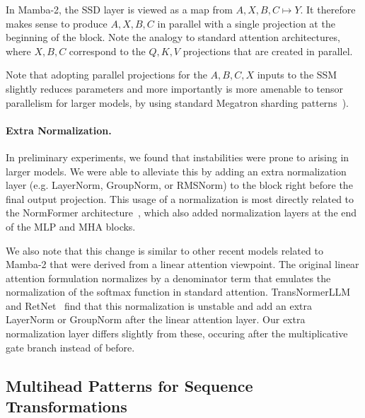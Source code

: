 \documentclass{article}
\newcommand{\citep}{\parencite}
\begin{document}
In Mamba-2, the SSD layer is viewed as a map from $A, X, B, C \mapsto Y$.
It therefore makes sense to produce $A, X, B, C$ in parallel with a single projection at the beginning of the block.
Note the analogy to standard attention architectures,
where $X, B, C$ correspond to the $Q, K, V$ projections that are created in parallel.

Note that adopting parallel projections for the $A, B, C, X$ inputs to the SSM slightly reduces parameters and more importantly is more amenable to tensor parallelism for larger models, by using standard Megatron sharding patterns~\citep{shoeybi2019megatron}).

\paragraph{Extra Normalization.}

In preliminary experiments, we found that instabilities were prone to arising in larger models.
We were able to alleviate this by adding an extra normalization layer (e.g. LayerNorm, GroupNorm, or RMSNorm) to the block right before the final output projection.
This usage of a normalization is most directly related to the NormFormer architecture~\citep{shleifer2021normformer}, which also added normalization layers at the end of the MLP and MHA blocks.

We also note that this change is similar to other recent models related to Mamba-2 that were derived from a linear attention viewpoint.
The original linear attention formulation normalizes by a denominator term that emulates the normalization of the softmax function in standard attention.
TransNormerLLM~\citep{qin2023transnormerllm} and RetNet~\citep{sun2023retentive} find that this normalization is unstable and add an extra LayerNorm or GroupNorm after the linear attention layer.
Our extra normalization layer differs slightly from these, occuring after the multiplicative gate branch instead of before.

\subsection{Multihead Patterns for Sequence Transformations}
\label{sec:architecture:multihead}
\end{document}
